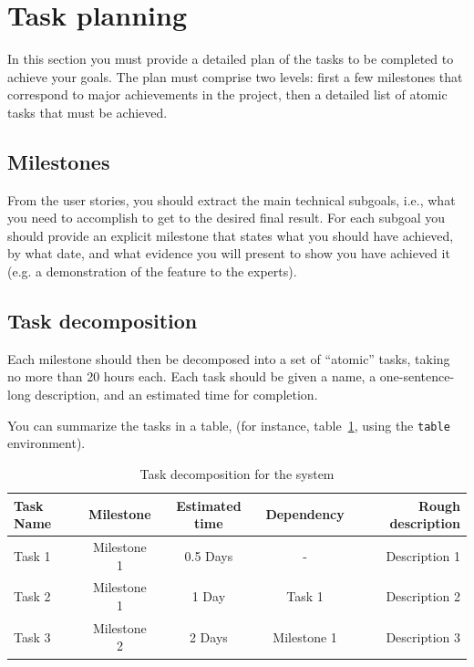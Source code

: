 \documentclass{article}
\begin{document}
\section{Task planning}
In this section you must provide a detailed plan of the tasks to be completed to achieve your goals. The plan must comprise two levels: first a few milestones that correspond to major achievements in the project, then a detailed list of atomic tasks that must be achieved.

\subsection{Milestones} 
From the user stories, you should extract the main technical subgoals, i.e., what you need to accomplish to get to the desired final result. For each subgoal you should provide an explicit milestone that states what you should have achieved, by what date, and what evidence you will present to show you have achieved it (e.g. a demonstration of the feature to the experts).


\subsection{Task decomposition} 
Each milestone should then be decomposed into a set of ``atomic'' tasks, taking no more than 20 hours each. Each task should be given a name, a one-sentence-long description, and an estimated time for completion.


You can summarize the tasks in a table, (for instance, table~\ref{tab:sample-table}, using the \verb+table+ environment).

\begin{table}[h]
\vskip 3mm
\begin{center}
\begin{small}
\begin{sc}
\begin{tabular}{lcccr}
\hline
\abovespace\belowspace
Task Name & Milestone  & Estimated time & Dependency &  Rough description \\
\hline
\abovespace
Task 1 & Milestone 1    & 0.5 Days & - & Description 1 \\
Task 2 & Milestone 1    & 1 Day  & Task 1 & Description 2 \\
Task 3 & Milestone 2    & 2 Days & Milestone 1 & Description 3 
\belowspace
\end{tabular}
\end{sc}
\end{small}
\caption{Task decomposition for the system}
\label{tab:sample-table}
\end{center}
\vskip -3mm
\end{table}
\end{document}
